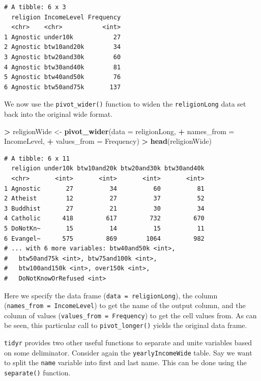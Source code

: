 \documentclass[
]{krantz}
\makeatletter
\newenvironment{Shaded}{\begin{snugshade}}{\end{snugshade}}
\newcommand{\DataTypeTok}[1]{\textcolor[rgb]{0.27,0.27,0.27}{#1}}
\newcommand{\KeywordTok}[1]{\textcolor[rgb]{0.27,0.27,0.27}{\textbf{#1}}}
\newcommand{\NormalTok}[1]{#1}
\newcommand{\OperatorTok}[1]{\textcolor[rgb]{0.43,0.43,0.43}{\textbf{#1}}}
\newcommand{\StringTok}[1]{\textcolor[rgb]{0.5,0.5,0.5}{#1}}
\newenvironment{kframe}{%
\medskip{}
\setlength{\fboxsep}{.8em}
 \def\at@end@of@kframe{}%
 \ifinner\ifhmode%
  \def\at@end@of@kframe{\end{minipage}}%
  \begin{minipage}{\columnwidth}%
 \fi\fi%
 \def\FrameCommand##1{\hskip\@totalleftmargin \hskip-\fboxsep
 \colorbox{shadecolor}{##1}\hskip-\fboxsep
     \hskip-\linewidth \hskip-\@totalleftmargin \hskip\columnwidth}%
 \MakeFramed {\advance\hsize-\width
   \@totalleftmargin\z@ \linewidth\hsize
   \@setminipage}}%
 {\par\unskip\endMakeFramed%
 \at@end@of@kframe}
\renewenvironment{Shaded}{\begin{kframe}}{\end{kframe}}
\makeatother
\begin{document}
\begin{verbatim}
# A tibble: 6 x 3
  religion IncomeLevel Frequency
  <chr>    <chr>           <int>
1 Agnostic under10k           27
2 Agnostic btw10and20k        34
3 Agnostic btw20and30k        60
4 Agnostic btw30and40k        81
5 Agnostic btw40and50k        76
6 Agnostic btw50and75k       137
\end{verbatim}

We now use the \texttt{pivot\_wider()} function to widen the \texttt{religionLong} data set back into the original wide format.

\begin{Shaded}
\begin{Highlighting}[]
\OperatorTok{\textgreater{}}\StringTok{ }\NormalTok{religionWide \textless{}{-}}\StringTok{ }\KeywordTok{pivot\_wider}\NormalTok{(}\DataTypeTok{data =}\NormalTok{ religionLong, }
\OperatorTok{+}\StringTok{               }\DataTypeTok{names\_from =}\NormalTok{ IncomeLevel, }
\OperatorTok{+}\StringTok{               }\DataTypeTok{values\_from =}\NormalTok{ Frequency)}
\OperatorTok{\textgreater{}}\StringTok{ }\KeywordTok{head}\NormalTok{(religionWide)}
\end{Highlighting}
\end{Shaded}

\begin{verbatim}
# A tibble: 6 x 11
  religion under10k btw10and20k btw20and30k btw30and40k
  <chr>       <int>       <int>       <int>       <int>
1 Agnostic       27          34          60          81
2 Atheist        12          27          37          52
3 Buddhist       27          21          30          34
4 Catholic      418         617         732         670
5 DoNotKn~       15          14          15          11
6 Evangel~      575         869        1064         982
# ... with 6 more variables: btw40and50k <int>,
#   btw50and75k <int>, btw75and100k <int>,
#   btw100and150k <int>, over150k <int>,
#   DoNotKnowOrRefused <int>
\end{verbatim}

Here we specify the data frame (\texttt{data\ =\ religionLong}), the column (\texttt{names\_from\ =\ IncomeLevel}) to get the name of the output column, and the column of values (\texttt{values\_from\ =\ Frequency}) to get the cell values from. As can be seen, this particular call to \texttt{pivot\_longer()} yields the original data frame.

\texttt{tidyr} provides two other useful functions to separate and unite variables based on some deliminator. Consider again the \texttt{yearlyIncomeWide} table. Say we want to split the \texttt{name} variable into first and last name. This can be done using the \texttt{separate()} function.
\end{document}
